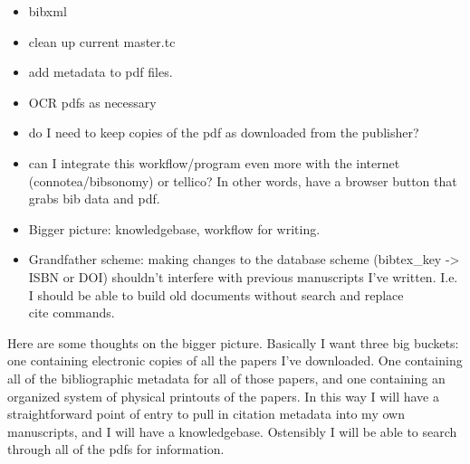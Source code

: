 \documentclass[letterpaper,12pt]{article}
\begin{document}
\begin{itemize}
\item bibxml
\item clean up current master.tc
\item add metadata to pdf files.
\item OCR pdfs as necessary
\item do I need to keep copies of the pdf as downloaded from the publisher?
\item can I integrate this workflow/program even more with the internet (connotea/bibsonomy) or tellico? In other words, have a browser button that grabs bib data and pdf.
\item Bigger picture: knowledgebase, workflow for writing.
\item Grandfather scheme: making changes to the database scheme (bibtex\_key -> ISBN or DOI) shouldn't interfere with previous manuscripts I've written. I.e. I should be able to build old documents without search and replace \\cite commands.
\end{itemize}

Here are some thoughts on the bigger picture. Basically I want three big buckets: one containing electronic copies of all the papers I've downloaded. One containing all of the bibliographic metadata for all of those papers, and one containing an organized system of physical printouts of the papers. In this way I will have a straightforward point of entry to pull in citation metadata into my own manuscripts, and I will have a knowledgebase. Ostensibly I will be able to search through all of the pdfs for information.
\end{document}
